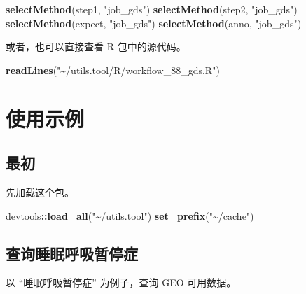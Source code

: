 \documentclass[
]{article}
\newenvironment{Shaded}{\begin{snugshade}}{\end{snugshade}}
\newcommand{\KeywordTok}[1]{\textcolor[rgb]{0.13,0.29,0.53}{\textbf{#1}}}
\newcommand{\NormalTok}[1]{#1}
\newcommand{\OperatorTok}[1]{\textcolor[rgb]{0.81,0.36,0.00}{\textbf{#1}}}
\newcommand{\StringTok}[1]{\textcolor[rgb]{0.31,0.60,0.02}{#1}}
\begin{document}
\begin{Shaded}
\begin{Highlighting}[]
\KeywordTok{selectMethod}\NormalTok{(step1, }\StringTok{"job\_gds"}\NormalTok{)}
\KeywordTok{selectMethod}\NormalTok{(step2, }\StringTok{"job\_gds"}\NormalTok{)}
\KeywordTok{selectMethod}\NormalTok{(expect, }\StringTok{"job\_gds"}\NormalTok{)}
\KeywordTok{selectMethod}\NormalTok{(anno, }\StringTok{"job\_gds"}\NormalTok{)}
\end{Highlighting}
\end{Shaded}

或者，也可以直接查看 R 包中的源代码。

\begin{Shaded}
\begin{Highlighting}[]
\KeywordTok{readLines}\NormalTok{(}\StringTok{"\textasciitilde{}/utils.tool/R/workflow\_88\_gds.R"}\NormalTok{)}
\end{Highlighting}
\end{Shaded}

\hypertarget{ux4f7fux7528ux793aux4f8b}{%
\section{使用示例}\label{ux4f7fux7528ux793aux4f8b}}

\hypertarget{ux6700ux521d}{%
\subsection{最初}\label{ux6700ux521d}}

先加载这个包。

\begin{Shaded}
\begin{Highlighting}[]
\NormalTok{devtools}\OperatorTok{::}\KeywordTok{load\_all}\NormalTok{(}\StringTok{"\textasciitilde{}/utils.tool"}\NormalTok{)}
\KeywordTok{set\_prefix}\NormalTok{(}\StringTok{"\textasciitilde{}/cache"}\NormalTok{)}
\end{Highlighting}
\end{Shaded}

\hypertarget{ux67e5ux8be2ux7761ux7720ux547cux5438ux6682ux505cux75c7}{%
\subsection{查询睡眠呼吸暂停症}\label{ux67e5ux8be2ux7761ux7720ux547cux5438ux6682ux505cux75c7}}

以 ``睡眠呼吸暂停症'' 为例子，查询 GEO 可用数据。
\end{document}
